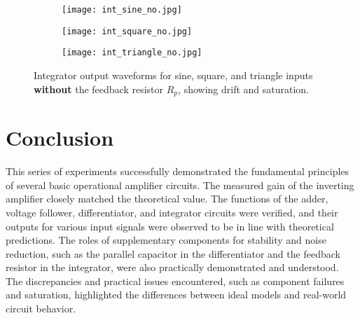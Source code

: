 \documentclass[12pt,a4paper]{article}
\begin{document}
\begin{figure}[H]
    \centering
    \begin{subfigure}[b]{0.32\linewidth}
        \texttt{[image: int\_sine\_no.jpg]} %
    \end{subfigure}
    \begin{subfigure}[b]{0.32\linewidth}
        \texttt{[image: int\_square\_no.jpg]} %
    \end{subfigure}
    \begin{subfigure}[b]{0.32\linewidth}
        \texttt{[image: int\_triangle\_no.jpg]} %
    \end{subfigure}
    \caption{Integrator output waveforms for sine, square, and triangle inputs \textbf{without} the feedback resistor \(R_p\), showing drift and saturation.}
    \label{fig:integrator_no}
\end{figure}




\section{Conclusion}
This series of experiments successfully demonstrated the fundamental principles of several basic operational amplifier circuits. The measured gain of the inverting amplifier closely matched the theoretical value. The functions of the adder, voltage follower, differentiator, and integrator circuits were verified, and their outputs for various input signals were observed to be in line with theoretical predictions. The roles of supplementary components for stability and noise reduction, such as the parallel capacitor in the differentiator and the feedback resistor in the integrator, were also practically demonstrated and understood. The discrepancies and practical issues encountered, such as component failures and saturation, highlighted the differences between ideal models and real-world circuit behavior.
\end{document}

